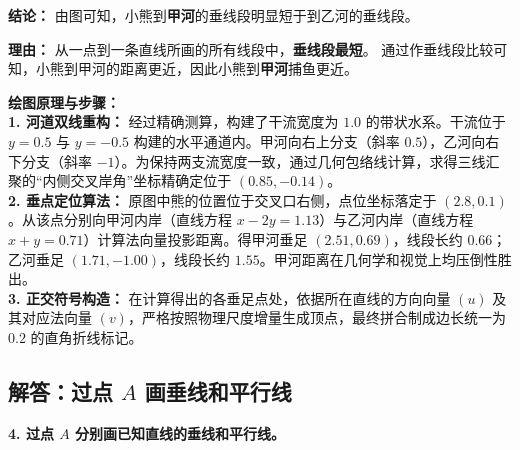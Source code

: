 \vspace{0.3cm}
\textbf{结论：} 由图可知，小熊到\textbf{甲河}的垂线段明显短于到乙河的垂线段。

\textbf{理由：} 从一点到一条直线所画的所有线段中，\textbf{垂线段最短}。
通过作垂线段比较可知，小熊到甲河的距离更近，因此小熊到\textbf{甲河}捕鱼更近。

\vspace{0.4cm}
{\small\color{blue!70!black}
\textbf{绘图原理与步骤：}\\
\textbf{1. 河道双线重构：} 经过精确测算，构建了干流宽度为 $1.0$ 的带状水系。干流位于 $y=0.5$ 与 $y=-0.5$ 构建的水平通道内。甲河向右上分支（斜率 $0.5$），乙河向右下分支（斜率 $-1$）。为保持两支流宽度一致，通过几何包络线计算，求得三线汇聚的“内侧交叉岸角”坐标精确定位于 $(0.85, -0.14)$。\\
\textbf{2. 垂点定位算法：} 原图中熊的位置位于交叉口右侧，点位坐标落定于 $(2.8, 0.1)$。从该点分别向甲河内岸（直线方程 $x - 2y = 1.13$）与乙河内岸（直线方程 $x + y = 0.71$）计算法向量投影距离。得甲河垂足 $(2.51, 0.69)$，线段长约 $0.66$；乙河垂足 $(1.71, -1.00)$，线段长约 $1.55$。甲河距离在几何学和视觉上均压倒性胜出。\\
\textbf{3. 正交符号构造：} 在计算得出的各垂足点处，依据所在直线的方向向量 $(u)$ 及其对应法向量 $(v)$，严格按照物理尺度增量生成顶点，最终拼合制成边长统一为 $0.2$ 的直角折线标记。
}

\newpage

\newpage

\subsection{解答：过点 $A$ 画垂线和平行线}

\vspace{0.4cm}

\noindent\textbf{4. 过点 $A$ 分别画已知直线的垂线和平行线。}

\vspace{1.2cm}

